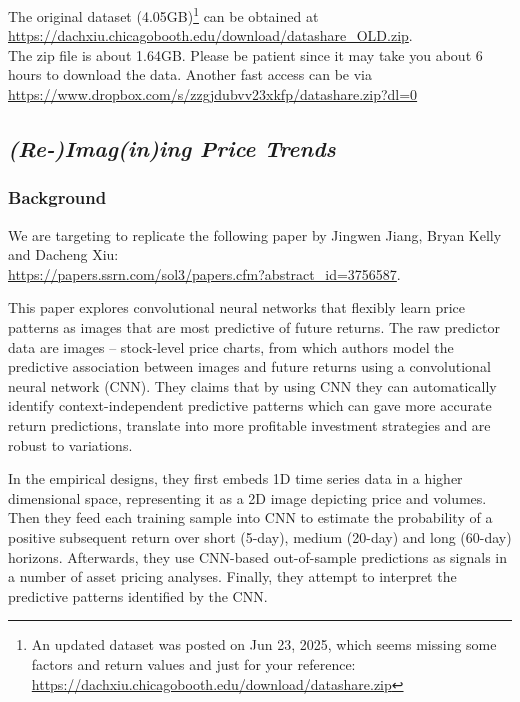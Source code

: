 \documentclass[11pt]{article}
\begin{document}
The original dataset (4.05GB)\footnote{An updated dataset was posted on Jun 23, 2025, which seems missing some factors and return values and just for your reference: \url{https://dachxiu.chicagobooth.edu/download/datashare.zip} } can be obtained at \\ 
\url{https://dachxiu.chicagobooth.edu/download/datashare_OLD.zip}. \\
The zip file is about 1.64GB. Please be patient since it may take you about 6 hours to download the data. Another fast access can be via \\
\url{https://www.dropbox.com/s/zzgjdubvv23xkfp/datashare.zip?dl=0}





\subsection{\emph{(Re-)Imag(in)ing Price Trends}}

\subsubsection{Background}
We are targeting to replicate the following paper by Jingwen Jiang, Bryan Kelly and Dacheng Xiu: \\
\url{https://papers.ssrn.com/sol3/papers.cfm?abstract_id=3756587}.

This paper explores convolutional neural networks that flexibly learn price patterns as images that are most predictive of future returns. The raw predictor data are images -- stock-level price charts, from which authors model the predictive association between images and future returns using a convolutional neural network (CNN). They claims that by using CNN they can automatically identify context-independent predictive patterns which can gave more accurate return predictions, translate into more profitable investment strategies and are robust to variations. 

In the empirical designs, they first embeds 1D time series data in a higher dimensional space, representing it as a 2D image depicting price and volumes. Then they feed each training sample into CNN to estimate the probability of a positive subsequent return over short (5-day), medium (20-day) and long (60-day) horizons. Afterwards, they use CNN-based out-of-sample predictions as signals in a number of asset pricing analyses. Finally, they attempt to interpret the predictive patterns identified by the CNN.
\end{document}
